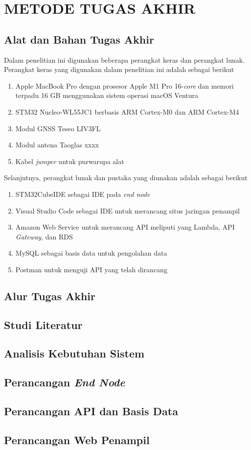 \chapter{METODE TUGAS AKHIR}

\section{Alat dan Bahan Tugas Akhir}
Dalam penelitian ini digunakan beberapa perangkat keras dan perangkat lunak. Perangkat keras yang digunakan dalam penelitian ini adalah sebagai berikut
\begin{enumerate}
	\item Apple MacBook Pro dengan prosesor Apple M1 Pro 16-\textit{core} dan memori terpadu 16 GB menggunakan sistem operasi macOS Ventura
	\item STM32 Nucleo-WL55JC1 berbasis ARM Cortex-M0 dan ARM Cortex-M4
	\item Modul GNSS Teseo LIV3FL
	\item Modul antena Taoglas xxxx
	\item Kabel \textit{jumper} untuk purwarupa alat
\end{enumerate}
Selanjutnya, perangkat lunak dan pustaka yang diunakan adalah sebagai berikut
\begin{enumerate}
	\item STM32CubeIDE sebagai IDE pada \textit{end node}
	\item Visual Studio Code sebagai IDE untuk merancang situs jaringan penampil
	\item Amazon Web Service untuk merancang API meliputi yang Lambda, API \textit{Gateway}, dan RDS
	\item MySQL sebagai basis data untuk pengolahan data
	\item Postman untuk menguji API yang telah dirancang
\end{enumerate}

\section{Alur Tugas Akhir}

\section{Studi Literatur}

\section{Analisis Kebutuhan Sistem}

\section{Perancangan \textit{End Node}}

\section{Perancangan API dan Basis Data}

\section{Perancangan Web Penampil}